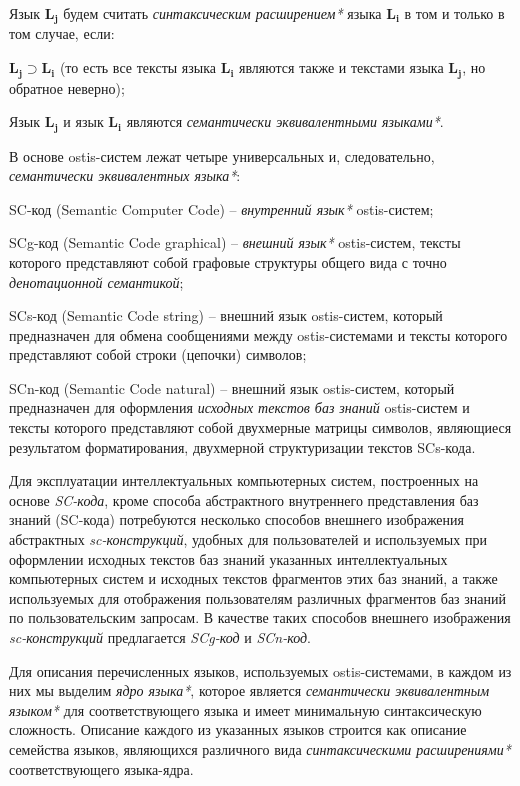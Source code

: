 \begin{SCn}
{Язык $\bm{L_j}$ будем считать \textit{синтаксическим расширением*} языка $\bm{L_i}$ в том и только в том случае, если:

\begin{scnitemize}
\item $\bm{L_j} \supset \bm{L_i}$ (то есть все тексты языка $\bm{L_i}$ являются также и текстами языка $\bm{L_j}$, но обратное неверно);
\item Язык $\bm{L_j}$ и язык $\bm{L_i}$ являются \textit{семантически эквивалентными языками*}.
\end{scnitemize}

В основе ostis-систем лежат четыре универсальных и, следовательно, \textit{семантически эквивалентных языка*}: 
\begin{scnitemize}
\item SC-код (Semantic Computer Code) -- \textit{внутренний язык*} ostis-систем; 
\item SCg-код (Semantic Code graphical) -- \textit{внешний язык*} ostis-систем, тексты которого представляют собой графовые структуры общего вида с точно \textit{денотационной семантикой};
\item SCs-код (Semantic Code string) -- внешний язык ostis-систем, который предназначен для обмена сообщениями между ostis-системами и тексты которого представляют собой строки (цепочки) символов;
\item SCn-код (Semantic Code natural) -- внешний язык ostis-систем, который предназначен для оформления \textit{исходных текстов баз знаний} ostis-систем и тексты которого представляют собой двухмерные матрицы символов, являющиеся результатом форматирования, двухмерной структуризации текстов SCs-кода.
\end{scnitemize}

Для эксплуатации интеллектуальных компьютерных систем,  построенных на основе \textit{SC-кода}, кроме способа абстрактного внутреннего представления баз знаний (SC-кода) потребуются несколько способов внешнего изображения абстрактных \textit{sc-конструкций}, удобных для пользователей и используемых при оформлении исходных текстов баз знаний указанных интеллектуальных компьютерных систем и исходных текстов фрагментов этих баз знаний, а также используемых для отображения пользователям различных фрагментов баз знаний по пользовательским запросам. В качестве таких способов внешнего изображения \textit{sc-конструкций} предлагается \textit{SCg-код} и \textit{SCn-код}.

Для описания перечисленных языков, используемых ostis-системами, в каждом из них мы выделим \textit{ядро языка*}, которое является \textit{семантически эквивалентным языком*} для соответствующего языка и имеет минимальную синтаксическую сложность. Описание каждого из указанных языков строится как описание семейства языков, являющихся различного вида \textit{синтаксическими расширениями*} соответствующего языка-ядра.
}

\end{SCn}




